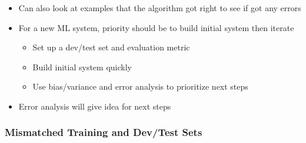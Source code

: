 \documentclass[12pt, letterpaper]{article}
\begin{document}
\begin{itemize}
        \item Can also look at examples that the algorithm got right to see if got any errors
        \item For a new ML system, priority should be to build initial system then iterate
        \begin{itemize}
            \item Set up a dev/test set and evaluation metric
            \item Build initial system quickly
            \item Use bias/variance and error analysis to prioritize next steps
        \end{itemize}
        \item Error analysis will give idea for next steps
    \end{itemize}
    \subsubsection{Mismatched Training and Dev/Test Sets}
\end{document}
